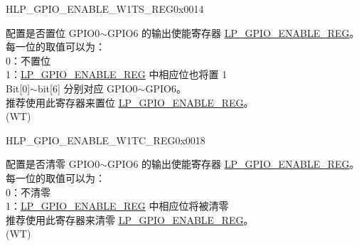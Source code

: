 \begin{register}{H}{LP\_GPIO\_ENABLE\_W1TS\_REG}{0x0014}\label{regdesc:LPGPIOENABLEW1TSREG}
%
%
\regnewline%
\begin{regdesc}\begin{reglist}
\label{fielddesc:LPGPIOENABLEW1TS}\item [LP\_GPIO\_ENABLE\_W1TS] 配置是否置位 GPIO0$\sim$GPIO6 的输出使能寄存器 \hyperref[regdesc:LPGPIOENABLEREG]{LP\_GPIO\_ENABLE\_REG}。\\
每一位的取值可以为：\\
0：不置位\\
1：\hyperref[regdesc:LPGPIOENABLEREG]{LP\_GPIO\_ENABLE\_REG} 中相应位也将置 1 \\
Bit[0]$\sim$bit[6] 分别对应 GPIO0$\sim$GPIO6。\\
推荐使用此寄存器来置位 \hyperref[regdesc:LPGPIOENABLEREG]{LP\_GPIO\_ENABLE\_REG}。\\
(WT)
\end{reglist}\end{regdesc}
\end{register}


\begin{register}{H}{LP\_GPIO\_ENABLE\_W1TC\_REG}{0x0018}\label{regdesc:LPGPIOENABLEW1TCREG}
%
%
\regnewline%
\begin{regdesc}\begin{reglist}
\label{fielddesc:LPGPIOENABLEW1TC}\item [LP\_GPIO\_ENABLE\_W1TC] 配置是否清零 GPIO0$\sim$GPIO6 的输出使能寄存器 \hyperref[regdesc:LPGPIOENABLEREG]{LP\_GPIO\_ENABLE\_REG}。\\
每一位的取值可以为：\\
0：不清零\\
1：\hyperref[regdesc:LPGPIOENABLEREG]{LP\_GPIO\_ENABLE\_REG} 中相应位将被清零\\
推荐使用此寄存器来清零 \hyperref[regdesc:LPGPIOENABLEREG]{LP\_GPIO\_ENABLE\_REG}。\\
(WT)
\end{reglist}\end{regdesc}
\end{register}


